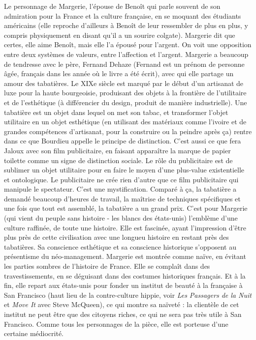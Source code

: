\documentclass[a4paper,12pt]{book}
\begin{document}
\par Le personnage de Margerie, l'épouse de Benoît qui parle souvent de son admiration pour la France et la culture française, en se moquant des étudiants américains (elle reproche d'ailleurs à Benoît de leur ressembler de plus en plus, y compris physiquement en disant qu'il a un sourire colgate). Margerie dit que certes, elle aime Benoît, mais elle l'a épousé pour l'argent. On voit une opposition entre deux systèmes de valeurs, entre l'affection et l'argent. Margerie a beaucoup de tendresse avec le père, Fernand Dehaze (Fernand est un prénom de personne âgée, français dans les année où le livre a été écrit), avec qui elle partage un amour des tabatières. Le XIXe siècle est marqué par le début d'un artisanat de luxe pour la haute bourgeoisie, produisant des objets à la frontière de l'utilitaire et de l'esthétique (à différencier du design, produit de manière industrielle). Une tabatière est un objet dans lequel on met son tabac, et transformer l'objet utilitaire en un objet esthétique (en utilisant des matériaux comme l'ivoire et de grandes compétences d'artisanat, pour la construire ou la peindre après ça) rentre dans ce que Bourdieu appelle le principe de distinction. C'est aussi ce que fera Jaloux avec son film publicitaire, en faisant apparaître la marque de papier toilette comme un signe de distinction sociale. Le rôle du publicitaire est de sublimer un objet utilitaire pour en faire le moyen d'une plus-value existentielle et ontologique. Le publicitaire ne crée rien d'autre que ce film publicitaire qui manipule le spectateur. C'est une mystification. Comparé à ça, la tabatière a demandé beaucoup d'heures de travail, la maîtrise de techniques spécifiques et une fois que tout est assemblé, la tabatière a un grand prix. C'est pour Margerie (qui vient du peuple sans histoire - les blancs des états-unis) l'emblème d'une culture raffinée, de toute une histoire. Elle est fascinée, ayant l'impression d'être plus près de cette civilisation avec une longueu histoire en restant près des tabatières. Sa conscience esthétique et sa conscience historique s'opposent au présentisme du néo-management. Margerie est montrée comme naïve, en évitant les parties sombres de l'histoire de France. Elle se complaît dans des travestissements, en se déguisant dans des costumes historiques français. Et à la fin, elle repart aux états-unis pour fonder un institut de beauté à la française à San Francisco (haut lieu de la contre-culture hippie, voir \textit{Les Passagers de la Nuit} et \textit{Move It} avec Steve McQueen), ce qui montre sa naïveté : la clientèle de cet institut ne peut être que des citoyens riches, ce qui ne sera pas très utile à San Francisco. Comme tous les personnages de la pièce, elle est porteuse d'une certaine médiocrité. 
\end{document}

